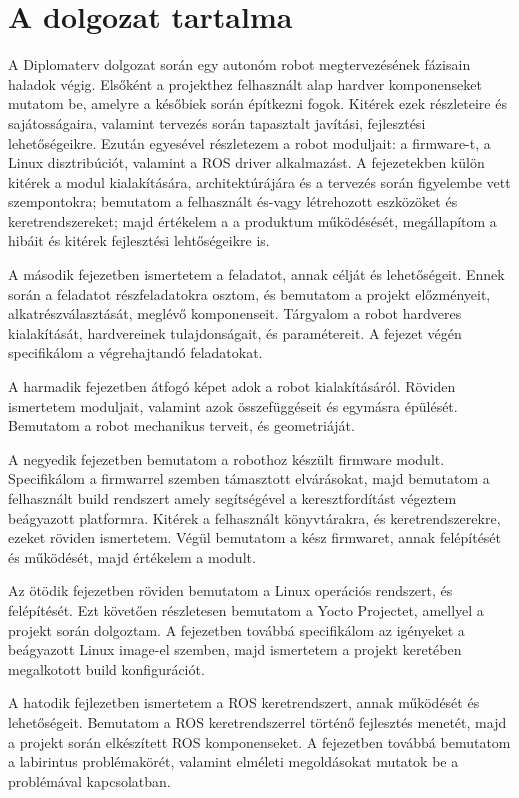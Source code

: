 \section{A dolgozat tartalma}

A Diplomaterv dolgozat során egy autonóm robot megtervezésének fázisain haladok
végig. Elsőként a projekthez felhasznált alap hardver komponenseket mutatom be,
amelyre a későbiek során építkezni fogok. Kitérek ezek részleteire és
sajátosságaira, valamint tervezés során tapasztalt javítási, fejlesztési
lehetőségeikre. Ezután egyesével részletezem a robot moduljait: a firmware-t, a
Linux disztribúciót, valamint a ROS driver alkalmazást. A fejezetekben külön
kitérek a modul kialakítására, architektúrájára és a tervezés során figyelembe
vett szempontokra; bemutatom a felhasznált és-vagy létrehozott eszközöket és
keretrendszereket; majd értékelem a a produktum működésését, megállapítom a
hibáit és kitérek fejlesztési lehtőségeikre is.

A második fejezetben ismertetem a feladatot, annak célját és lehetőségeit. Ennek
során a feladatot részfeladatokra osztom, és bemutatom a projekt előzményeit,
alkatrészválasztását, meglévő komponenseit. Tárgyalom a robot hardveres
kialakítását, hardvereinek tulajdonságait, és paramétereit. A fejezet végén
specifikálom a végrehajtandó feladatokat.

A harmadik fejezetben átfogó képet adok a robot kialakításáról. Röviden
ismertetem moduljait, valamint azok összefüggéseit és egymásra
épülését. Bemutatom a robot mechanikus terveit, és geometriáját.

A negyedik fejezetben bemutatom a robothoz készült firmware modult. Specifikálom
a firmwarrel szemben támasztott elvárásokat, majd bemutatom a felhasznált build
rendszert amely segítségével a keresztfordítást végeztem beágyazott
platformra. Kitérek a felhasznált könyvtárakra, és keretrendszerekre, ezeket
röviden ismertetem. Végül bemutatom a kész firmwaret, annak felépítését és
működését, majd értékelem a modult.

Az ötödik fejezetben röviden bemutatom a Linux operációs rendszert, és
felépítését. Ezt követően részletesen bemutatom a Yocto Projectet, amellyel a
projekt során dolgoztam. A fejezetben továbbá specifikálom az igényeket a
beágyazott Linux image-el szemben, majd ismertetem a projekt keretében
megalkotott build konfigurációt.

A hatodik fejlezetben ismertetem a ROS keretrendszert, annak működését és
lehetőségeit. Bemutatom a ROS keretrendszerrel történő fejlesztés menetét, majd a
projekt során elkészített ROS komponenseket. A fejezetben továbbá bemutatom a
labirintus problémakörét, valamint elméleti megoldásokat mutatok be a problémával
kapcsolatban. 

